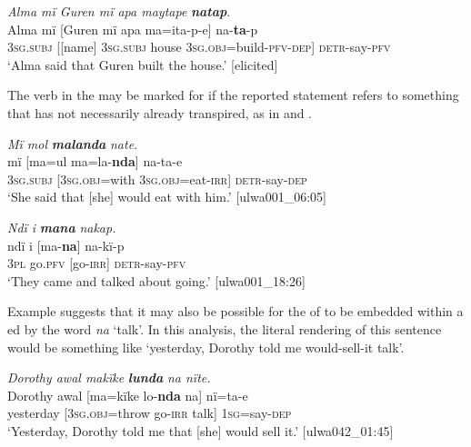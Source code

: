 \ea%
    \label{ex:syntax:232}
          \textit{Alma mï Guren mï apa maytape} \textbf{\textit{natap}}.\\
\gll Alma  mï      {[Guren}    mï      apa     {ma=ita-p-e]}        na-\textbf{ta}{}-p\\
    [name]  \textsc{3sg.subj}  [[name]  3\textsc{sg.subj}  house    3\textsc{sg.obj}=build-\textsc{pfv-dep]}  \textsc{detr-}say-\textsc{pfv}\\
\glt `Alma said that Guren built the house.’ [elicited]
\z

The verb in the  may be marked for   if the reported statement refers to something that has not necessarily already transpired, as in  and  .

\ea%
    \label{ex:syntax:233}
          \textit{Mï mol} \textbf{\textit{malanda}} \textit{nate.}\\
\gll    mï      [ma=ul      ma=la-\textbf{nda}]    na-ta-e\\
    3\textsc{sg.subj}  [3\textsc{sg.obj}=with  3\textsc{sg.obj}=eat-\textsc{irr]}  \textsc{detr-}say-\textsc{dep}\\
\glt `She said that [she] would eat with him.’ [ulwa001\_06:05]
\z

\ea%
    \label{ex:syntax:234}
          \textit{Ndï i} \textbf{\textit{mana}} \textit{nakap.}\\
\gll    ndï  i    [ma-\textbf{na}]  na-kï-p\\
    3\textsc{pl}  go.\textsc{pfv}  [go-\textsc{irr]}  \textsc{detr-}say-\textsc{pfv}\\
\glt `They came and talked about going.’ [ulwa001\_18:26]
\z

Example  suggests that it may also be possible for the  of  to be embedded within a  ed by the word \textit{na} ‘talk’. In this analysis, the literal rendering of this sentence would be something like ‘yesterday, Dorothy told me would-sell-it talk’.

\ea%
    \label{ex:syntax:235}
          \textit{Dorothy awal makïke} \textbf{\textit{lunda}} \textit{na nïte.}\\
\gll    Dorothy  awal    [ma=kïke      lo-\textbf{nda}  na]    nï=ta-e\\
    [name]    yesterday  [3\textsc{sg.obj}=throw  go-\textsc{irr}  talk]  \textsc{1sg}=say-\textsc{dep}\\
\glt `Yesterday, Dorothy told me that [she] would sell it.’ [ulwa042\_01:45]
\z

